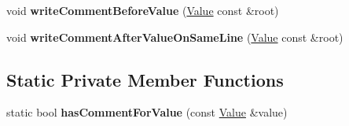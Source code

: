 \begin{DoxyCompactItemize}
\item 
\hypertarget{struct_json_1_1_built_styled_stream_writer_a32c4afca4e08fba79bb0a80a8010283a}{}void {\bfseries write\+Comment\+Before\+Value} (\hyperlink{class_json_1_1_value}{Value} const \&root)\label{struct_json_1_1_built_styled_stream_writer_a32c4afca4e08fba79bb0a80a8010283a}

\item 
\hypertarget{struct_json_1_1_built_styled_stream_writer_a89625b134fce0255263ca40e6125742b}{}void {\bfseries write\+Comment\+After\+Value\+On\+Same\+Line} (\hyperlink{class_json_1_1_value}{Value} const \&root)\label{struct_json_1_1_built_styled_stream_writer_a89625b134fce0255263ca40e6125742b}

\end{DoxyCompactItemize}
\subsection*{Static Private Member Functions}
\begin{DoxyCompactItemize}
\item 
\hypertarget{struct_json_1_1_built_styled_stream_writer_a457c2f3c1e8c952caeb60e52477d0c9a}{}static bool {\bfseries has\+Comment\+For\+Value} (const \hyperlink{class_json_1_1_value}{Value} \&value)\label{struct_json_1_1_built_styled_stream_writer_a457c2f3c1e8c952caeb60e52477d0c9a}

\end{DoxyCompactItemize}
